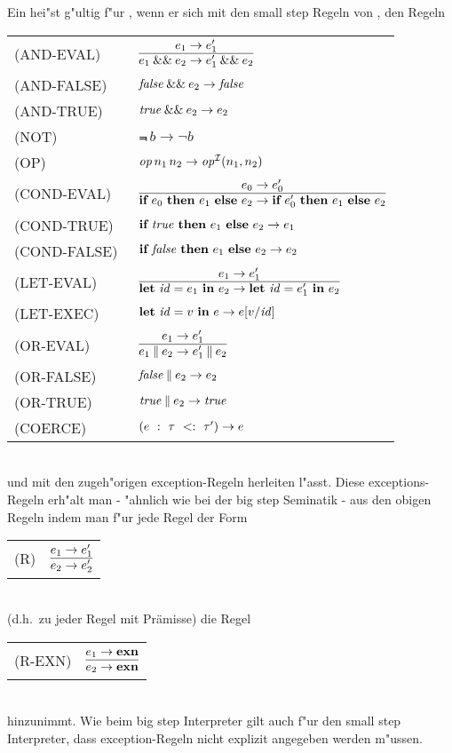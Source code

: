 Ein  hei"st g"ultig f"ur \LONE, wenn er sich mit den small step Regeln von \LZERO, den Regeln\\[5mm]
  \begin{tabular}{ll}
    \mbox{(AND-EVAL)}     & $\regel{e_1 \to e_1'}
                                 {\andalso{e_1}{e_2} \to \andalso{e_1'}{e_2}}$\\[5mm]
    \mbox{(AND-FALSE)}    & ${\text{\it false\/}}\mathbin{\&\&}e_2 \to {\text{\it false\/}}$\\[3mm]
    \mbox{(AND-TRUE)}     & ${\text{\it true\/}}\mathbin{\&\&}e_2 \to e_2$\\[3mm]
    \mbox{(NOT)}          & $\Not\,b \to \neg b$\\[3mm]
    \mbox{(OP)}           & ${\text{\it op\/}}\,n_1\,n_2 \to {\text{\it op\/}}^{{\cal I}}(n_1,n_2)$ \\[3mm]
    \mbox{(COND-EVAL)\ }  & $\regel{e_0 \to e'_0}
                            {\bifte{e_0}{e_1}{e_2} \to \bifte{e'_0}{e_1}{e_2}}$ \\[5mm]
    \mbox{(COND-TRUE)\ }  & $\textbf{if}\ {\text{\it true\/}}\ \textbf{then}\ e_1\ \textbf{else}\ e_2 \to e_1$ \\[3mm]
    \mbox{(COND-FALSE) }  & $\textbf{if}\ {\text{\it false\/}}\ \textbf{then}\ e_1\ \textbf{else}\ e_2 \to e_2$ \\[3mm]
    \mbox{(LET-EVAL)\  }  & $\regel{e_1 \to e'_1}
                            {\bli{\id}{e_1}{e_2} \to \bli{\id}{e'_1}{e_2}}$ \\[5mm]
    \mbox{(LET-EXEC)}       & $\textbf{let}\ {\text{\it id\/}} = v\ \textbf{in}\ e \to e[v/{\text{\it id\/}}]$ \\[5mm]
    \mbox{(OR-EVAL)}      & $\regel{e_1 \to e_1'}
                                   {\orelse{e_1}{e_2} \to \orelse{e_1'}{e_2}}$\\[5mm]
    \mbox{(OR-FALSE)}     & ${\text{\it false\/}}\mathbin{\|}e_2 \to e_2$\\[3mm]
    \mbox{(OR-TRUE)}      & ${\text{\it true\/}}\mathbin{\|}e_2 \to {\text{\it true\/}}$\\[3mm]
    \mbox{(COERCE)}       & $(e\ :\ \tau\ <:\ \tau') \to e$
  \end{tabular}\\[7mm]
und mit den zugeh"origen exception-Regeln herleiten l"asst. Diese exceptions-Regeln erh"alt man - "ahnlich wie
bei der big step Seminatik - aus den obigen Regeln indem man f"ur jede Regel der Form\\[2mm]
  \begin{tabular}{ll}
    \mbox{(R)} & $\regel{e_1 \to e'_1}{e_2 \to e'_2}$
  \end{tabular}\\[3mm]
(d.h.\ zu jeder Regel mit Pr\"amisse) die Regel \\[3mm]
  \begin{tabular}{ll}
    \mbox{(R-EXN)} & $\regel{e_1 \to \exn}{e_2 \to \exn}$
  \end{tabular}\\[3mm]
hinzunimmt. Wie beim big step Interpreter gilt auch f"ur den small step Interpreter, dass exception-Regeln nicht
explizit angegeben werden m"ussen.


